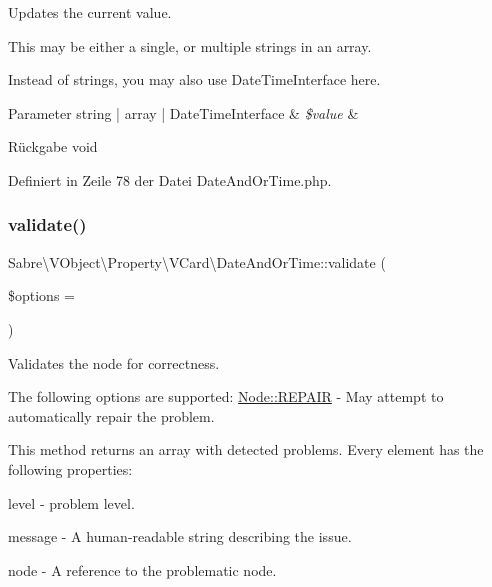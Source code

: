 Updates the current value.

This may be either a single, or multiple strings in an array.

Instead of strings, you may also use Date\+Time\+Interface here.


\begin{DoxyParams}[1]{Parameter}
string | array | Date\+Time\+Interface & {\em \$value} & \\
\hline
\end{DoxyParams}
\begin{DoxyReturn}{Rückgabe}
void 
\end{DoxyReturn}


Definiert in Zeile 78 der Datei Date\+And\+Or\+Time.\+php.

\mbox{\label{class_sabre_1_1_v_object_1_1_property_1_1_v_card_1_1_date_and_or_time_aa1f8a9309be805133f90e3051b1956af}} 
\subsubsection{\texorpdfstring{validate()}{validate()}}
{\footnotesize\ttfamily Sabre\textbackslash{}\+V\+Object\textbackslash{}\+Property\textbackslash{}\+V\+Card\textbackslash{}\+Date\+And\+Or\+Time\+::validate (\begin{DoxyParamCaption}\item[{}]{\$options = {} }\end{DoxyParamCaption})}

Validates the node for correctness.

The following options are supported\+: \mbox{\hyperlink{class_sabre_1_1_v_object_1_1_node_ac97a7fb85c1f871523336cd1ec6b29a9}{Node\+::\+R\+E\+P\+A\+IR}} -\/ May attempt to automatically repair the problem.

This method returns an array with detected problems. Every element has the following properties\+:


\begin{DoxyItemize}
\item level -\/ problem level.
\item message -\/ A human-\/readable string describing the issue.
\item node -\/ A reference to the problematic node.
\end{DoxyItemize}

